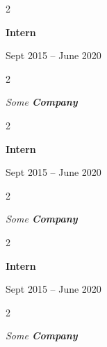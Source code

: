 \documentclass[10pt, letterpaper]{article}
\newenvironment{twocolentry}[2][]{
    \onecolentry
    \def\secondColumn{#2}
    \setcolumnwidth{\fill, 4.5 cm}
    \begin{paracol}{2}
}{
    \switchcolumn \raggedleft \secondColumn
    \end{paracol}
    \endonecolentry
} %
\begin{document}
        \vspace{0.2 cm}

                \begin{twocolentry}{
                    Sept 2015 – June 2020
                }
                \textbf{Intern}
                \end{twocolentry}
            \begin{twocolentry}{
            }
            \textit{Some \textbf{Company}}
            \end{twocolentry}



        \vspace{0.2 cm}

                \begin{twocolentry}{
                    Sept 2015 – June 2020
                }
                \textbf{Intern}
                \end{twocolentry}
            \begin{twocolentry}{
            }
            \textit{Some \textbf{Company}}
            \end{twocolentry}



        \vspace{0.2 cm}

                \begin{twocolentry}{
                    Sept 2015 – June 2020
                }
                \textbf{Intern}
                \end{twocolentry}
            \begin{twocolentry}{
            }
            \textit{Some \textbf{Company}}
            \end{twocolentry}
\end{document}
